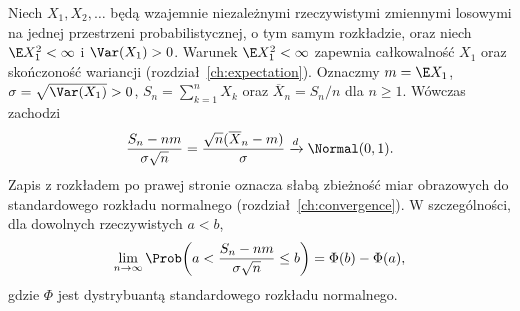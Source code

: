 \begin{twierdzenie}
Niech $X_1,X_2,\ldots$ będą wzajemnie niezależnymi
rzeczywistymi zmiennymi losowymi na jednej przestrzeni
probabilistycznej, o tym samym rozkładzie, oraz niech
$\E X_1^2<\infty$ i $\Var(X_1)>0$.
Warunek $\E X_1^2<\infty$ zapewnia całkowalność $X_1$
oraz skończoność wariancji (rozdział~\ref{ch:expectation}).
Oznaczmy $m=\E X_1$, $\sigma=\sqrt{\Var(X_1)}>0$,
$S_n=\sum_{k=1}^nX_k$ oraz $\overline X_n=S_n/n$
dla $n\geq1$. Wówczas zachodzi
\[
\frac{S_n-nm}{\sigma\sqrt n}
=\frac{\sqrt n(\overline X_n-m)}{\sigma}
\xrightarrow{d}\Normal(0,1).
\]
Zapis z rozkładem po prawej stronie oznacza słabą
zbieżność miar obrazowych do standardowego rozkładu
normalnego (rozdział~\ref{ch:convergence}).
W szczególności, dla dowolnych rzeczywistych $a<b$,
\[
\lim_{n\to\infty}
\Prob\!\left(a<\frac{S_n-nm}{\sigma\sqrt n}\leq b\right)
=\Phi(b)-\Phi(a),
\]
gdzie $\Phi$ jest dystrybuantą standardowego rozkładu
normalnego.
\end{twierdzenie}
